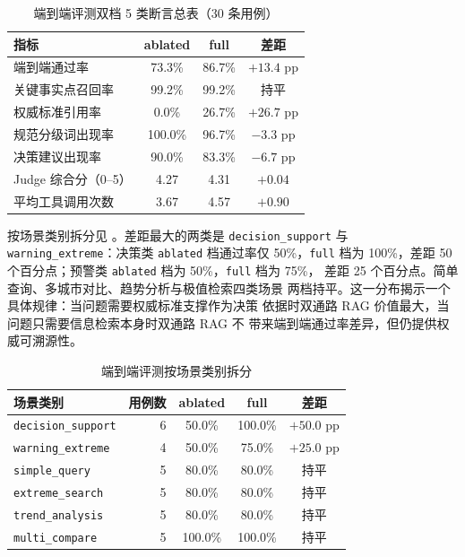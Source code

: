 \begin{table}[!htbp]
    \centering
    \caption{端到端评测双档 5 类断言总表（30 条用例）}
    \label{tab:e2e-overall}
    \song\fontsize{9pt}{12pt}\selectfont
    \renewcommand{\arraystretch}{0.95}
    \begin{tabular}{lccc}
        \toprule
        指标 & ablated & full & 差距 \\
        \midrule
        端到端通过率 & 73.3\% & 86.7\% & $+13.4$ pp \\
        关键事实点召回率 & 99.2\% & 99.2\% & 持平 \\
        权威标准引用率 & 0.0\% & 26.7\% & $+26.7$ pp \\
        规范分级词出现率 & 100.0\% & 96.7\% & $-3.3$ pp \\
        决策建议出现率 & 90.0\% & 83.3\% & $-6.7$ pp \\
        Judge 综合分（0--5） & 4.27 & 4.31 & $+0.04$ \\
        平均工具调用次数 & 3.67 & 4.57 & $+0.90$ \\
        \bottomrule
    \end{tabular}
\end{table}

按场景类别拆分见 。差距最大的两类是
\texttt{decision\_\bk{}support} 与 \texttt{warning\_\bk{}extreme}：决策类
\texttt{ablated} 档通过率仅 50\%，\texttt{full} 档为 100\%，差距 50
个百分点；预警类 \texttt{ablated} 档为 50\%，\texttt{full} 档为 75\%，
差距 25 个百分点。简单查询、多城市对比、趋势分析与极值检索四类场景
两档持平。这一分布揭示一个具体规律：当问题需要权威标准支撑作为决策
依据时双通路 RAG 价值最大，当问题只需要信息检索本身时双通路 RAG 不
带来端到端通过率差异，但仍提供权威可溯源性。

\begin{table}[!htbp]
    \centering
    \caption{端到端评测按场景类别拆分}
    \label{tab:e2e-by-category}
    \song\wuhao
    \begin{tabular}{lrccc}
        \toprule
        场景类别 & 用例数 & ablated & full & 差距 \\
        \midrule
        \texttt{decision\_\bk{}support} & 6 & 50.0\% & 100.0\% & $+50.0$ pp \\
        \texttt{warning\_\bk{}extreme} & 4 & 50.0\% & 75.0\% & $+25.0$ pp \\
        \texttt{simple\_\bk{}query} & 5 & 80.0\% & 80.0\% & 持平 \\
        \texttt{extreme\_\bk{}search} & 5 & 80.0\% & 80.0\% & 持平 \\
        \texttt{trend\_\bk{}analysis} & 5 & 80.0\% & 80.0\% & 持平 \\
        \texttt{multi\_\bk{}compare} & 5 & 100.0\% & 100.0\% & 持平 \\
        \bottomrule
    \end{tabular}
\end{table}

